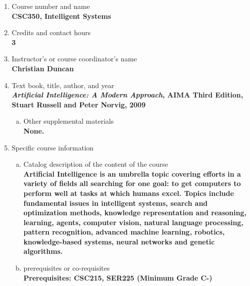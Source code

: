 \label{CSC350}  %
\begin{enumerate}[1.]
\item Course number and name\\
  {\bfseries
    CSC350, Intelligent Systems
  }
  
\item Credits and contact hours\\
  {\bfseries
    3    
  }

\item Instructor's or course coordinator's name\\
  {\bfseries
    Christian Duncan    
  }

\item Text book, title, author, and year\\
  {\bfseries
    {\em Artificial Intelligence: A Modern Approach}, AIMA Third Edition, Stuart Russell and Peter Norvig, 2009
  }
\begin{enumerate}[a.]
\item Other supplemental materials\\
  {\bfseries
    None.
  }
\end{enumerate}

\item Specific course information
\begin{enumerate}[a.]  
\item Catalog description of the content of the course\\
  {\bfseries
Artificial Intelligence is an umbrella topic covering efforts in a variety of fields all searching for one goal: to get computers to perform well at tasks at which humans excel. Topics include fundamental issues in intelligent systems, search and optimization methods, knowledge representation and reasoning, learning, agents, computer vision, natural language processing, pattern recognition, advanced machine learning, robotics, knowledge-based systems, neural networks and genetic algorithms. 
}

\item prerequisites or co-requisites\\
  {\bfseries
    Prerequisites: CSC215, SER225 (Minimum Grade C-)
  }


\end{enumerate}
\end{enumerate}
